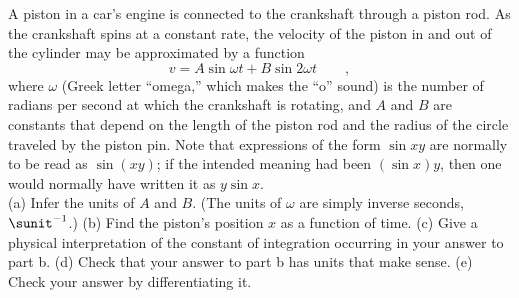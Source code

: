 A piston in a car's engine is connected to the crankshaft through a
piston rod. As the crankshaft spins at a constant rate, the velocity
of the piston in and out of the cylinder may be approximated by
a function
\begin{equation*}
  v = A\sin\omega t+B\sin 2\omega t \qquad ,
\end{equation*}
where $\omega$ (Greek letter ``omega,'' which makes the ``o'' sound)
is the number of radians per second at which the crankshaft is rotating,
and $A$ and $B$ are constants that depend on the length of the piston
rod and the radius of the circle traveled by the piston pin. Note that expressions
of the form $\sin xy$ are normally to be read as $\sin(xy)$; if the intended meaning
had been $(\sin x)y$, then one would normally have written it as $y\sin x$.\\
(a) Infer the units of $A$ and $B$. (The units of $\omega$ are simply inverse
seconds, $\sunit^{-1}$.)\hwendpart
(b) Find the piston's position $x$ as a function of time.\answercheck\hwendpart
(c) Give a physical interpretation of the constant of integration occurring in
your answer to part b.\hwendpart
(d) Check that your answer to part b has units that make sense.\hwendpart
(e) Check your answer by differentiating it.
